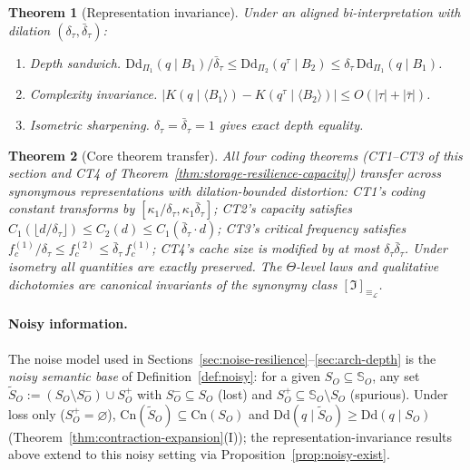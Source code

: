 \documentclass[journal]{IEEEtran}
\newcommand{\Dd}{\text{Dd}}
\newcommand{\Cn}{\text{Cn}}
\newtheorem{theorem}{Theorem}[section]
\numberwithin{equation}{section}
\begin{document}
\begin{theorem}[Representation invariance]
\label{thm:rep-inv}
Under an aligned bi-interpretation with dilation
$(\delta_\tau,\bar\delta_\tau)$:
\begin{enumerate}[label=\textup{(\alph*)}]
\item \emph{Depth sandwich.}\;
$\Dd_{\Pi_1}(q\mid B_1)/\bar\delta_\tau
\le\Dd_{\Pi_2}(q^\tau\mid B_2)
\le\delta_\tau\,\Dd_{\Pi_1}(q\mid B_1)$.

\item \emph{Complexity invariance.}\;
$|K(q\mid\langle B_1\rangle)
-K(q^\tau\mid\langle B_2\rangle)|
\le O(|\tau|{+}|\bar\tau|)$.

\item \emph{Isometric sharpening.}\;
$\delta_\tau=\bar\delta_\tau=1$ gives exact depth equality.
\end{enumerate}
\end{theorem}

\begin{theorem}[Core theorem transfer]
\label{thm:CT-transfer}
All four coding theorems \textup{(}CT1--CT3 of this section
and CT4 of Theorem~\textup{\ref{thm:storage-resilience-capacity})}
transfer across synonymous representations with
dilation-bounded distortion: CT1's coding constant
transforms by $[\kappa_1/\delta_\tau,\kappa_1\bar\delta_\tau]$;
CT2's capacity satisfies
$C_1(\lfloor d/\delta_\tau\rfloor)\le C_2(d)
\le C_1(\bar\delta_\tau\cdot d)$;
CT3's critical frequency satisfies
$f_c^{(1)}/\delta_\tau\le f_c^{(2)}
\le\bar\delta_\tau\,f_c^{(1)}$;
CT4's cache size is modified by at most
$\delta_\tau\bar\delta_\tau$.
Under isometry all quantities are exactly preserved.
The $\Theta$-level laws and qualitative dichotomies are
canonical invariants of the synonymy class
$[\mathfrak{I}]_{\equiv_{\mathcal{L}}}$.
\end{theorem}

\paragraph{Noisy information.}
The noise model used in
Sections~\ref{sec:noise-resilience}--\ref{sec:arch-depth} is
the \emph{noisy semantic base} of
Definition~\ref{def:noisy}: for a given $S_O\subseteq\mathbb S_O$,
any set $\tilde S_O:=(S_O\setminus S_O^-)\cup S_O^+$ with
$S_O^-\subseteq S_O$ (lost) and
$S_O^+\subseteq\mathbb S_O\setminus S_O$ (spurious).
Under loss only ($S_O^+=\varnothing$),
$\Cn(\tilde S_O)\subseteq\Cn(S_O)$ and
$\Dd(q\mid\tilde S_O)\ge\Dd(q\mid S_O)$
(Theorem~\ref{thm:contraction-expansion}(I));
the representation-invariance results above extend to this
noisy setting via
Proposition~\ref{prop:noisy-exist}.
\end{document}
